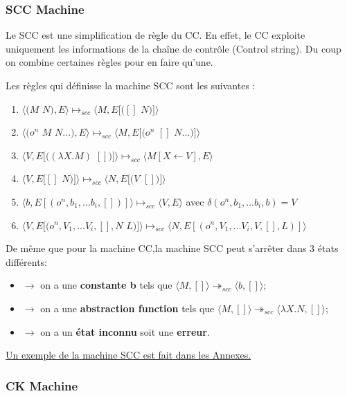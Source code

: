 \documentclass[10pt,a4paper]{article}
\begin{document}
			
			\subsubsection{SCC Machine}
			Le SCC est une simplification de règle du CC. En effet, le CC exploite uniquement les informations de la chaîne de contrôle (Control string). Du coup on combine certaines règles pour en faire qu'une.
			\bigbreak
			
			Les règles qui définisse la machine SCC sont les suivantes :
			
			\begin{enumerate}
				\item $\langle(M$ $N),E\rangle \longmapsto_{scc} \langle M,E[([]$ $N)]\rangle$
				\item $\langle(o^{n}$ $M$ $N...),E\rangle \longmapsto_{scc} \langle M,E[(o^{n}$ $[]$ $N...)]\rangle$
				\item $\langle V,E[((\lambda X.M)$ $[])]\rangle \longmapsto_{scc} \langle M[X\leftarrow V],E\rangle$
				\item $\langle V,E[[]$ $N)]\rangle \longmapsto_{scc} \langle N,E[(V$ $[])]\rangle$
				\item $\langle b,E[(o^{n},b_{1},...b_{i},[])]\rangle \longmapsto_{scc} \langle V,E\rangle$ avec $\delta (o^{n},b_{1},...b_{i},b)=V$ 
				\item $\langle V,E[(o^{n},V_{1},...V_{i},[],N$ $L)]\rangle \longmapsto_{scc} \langle N,E[(o^{n},V_{1},...V_{i},V,[],L)]\rangle$
			\end{enumerate}
			\bigbreak
			
			De même que pour la machine CC,la machine SCC peut s'arrêter dans 3 états différents:
			\begin{itemize}
				\item[]$\longrightarrow$ on a une \textbf{constante b} tels que $\langle M,[]\rangle \twoheadrightarrow_{scc} \langle b,[]\rangle$;
				\item[]$\longrightarrow$ on a une \textbf{abstraction function} tels que $\langle M,[]\rangle \twoheadrightarrow_{scc} \langle\lambda X.N,[]\rangle$;
				\item[]$\longrightarrow$ on a un \textbf{état inconnu} soit une \textbf{erreur}.
			\end{itemize}
			\bigbreak
			\hyperref[SCC]{Un exemple de la machine SCC est fait dans les Annexes.}
			\newpage
			\subsubsection{CK Machine}
			
\end{document}
